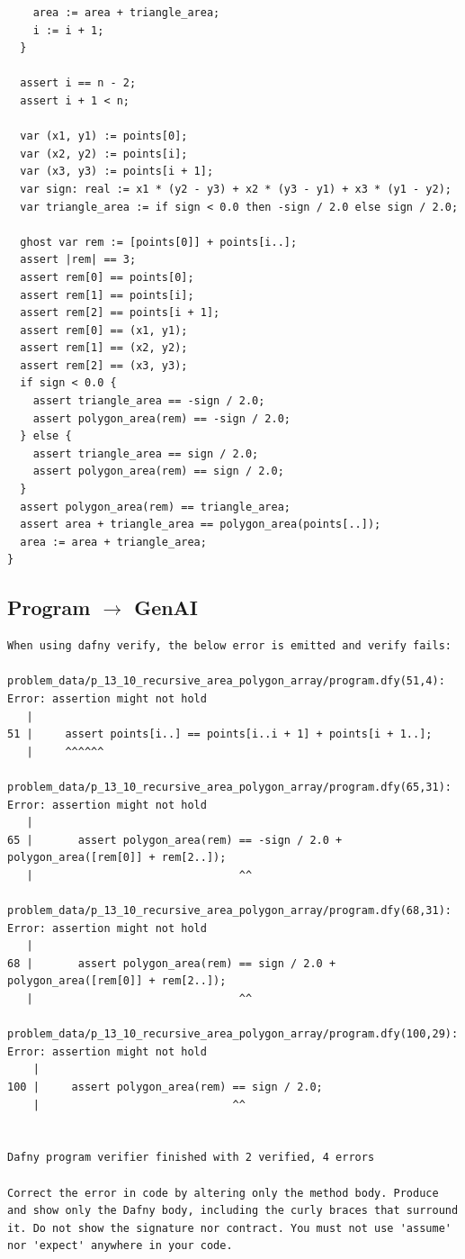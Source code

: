 \documentclass{article}
\begin{document}
\begin{lstlisting}
    area := area + triangle_area;
    i := i + 1;
  }

  assert i == n - 2;
  assert i + 1 < n;

  var (x1, y1) := points[0];
  var (x2, y2) := points[i];
  var (x3, y3) := points[i + 1];
  var sign: real := x1 * (y2 - y3) + x2 * (y3 - y1) + x3 * (y1 - y2);
  var triangle_area := if sign < 0.0 then -sign / 2.0 else sign / 2.0;

  ghost var rem := [points[0]] + points[i..];
  assert |rem| == 3;
  assert rem[0] == points[0];
  assert rem[1] == points[i];
  assert rem[2] == points[i + 1];
  assert rem[0] == (x1, y1);
  assert rem[1] == (x2, y2);
  assert rem[2] == (x3, y3);
  if sign < 0.0 {
    assert triangle_area == -sign / 2.0;
    assert polygon_area(rem) == -sign / 2.0;
  } else {
    assert triangle_area == sign / 2.0;
    assert polygon_area(rem) == sign / 2.0;
  }
  assert polygon_area(rem) == triangle_area;
  assert area + triangle_area == polygon_area(points[..]);
  area := area + triangle_area;
}
\end{lstlisting}
\subsection*{Program $\rightarrow$ GenAI}
\begin{lstlisting}
When using dafny verify, the below error is emitted and verify fails:

problem_data/p_13_10_recursive_area_polygon_array/program.dfy(51,4): Error: assertion might not hold
   |
51 |     assert points[i..] == points[i..i + 1] + points[i + 1..];
   |     ^^^^^^

problem_data/p_13_10_recursive_area_polygon_array/program.dfy(65,31): Error: assertion might not hold
   |
65 |       assert polygon_area(rem) == -sign / 2.0 + polygon_area([rem[0]] + rem[2..]);
   |                                ^^

problem_data/p_13_10_recursive_area_polygon_array/program.dfy(68,31): Error: assertion might not hold
   |
68 |       assert polygon_area(rem) == sign / 2.0 + polygon_area([rem[0]] + rem[2..]);
   |                                ^^

problem_data/p_13_10_recursive_area_polygon_array/program.dfy(100,29): Error: assertion might not hold
    |
100 |     assert polygon_area(rem) == sign / 2.0;
    |                              ^^


Dafny program verifier finished with 2 verified, 4 errors

Correct the error in code by altering only the method body. Produce and show only the Dafny body, including the curly braces that surround it. Do not show the signature nor contract. You must not use 'assume' nor 'expect' anywhere in your code.
\end{lstlisting}
\end{document}
